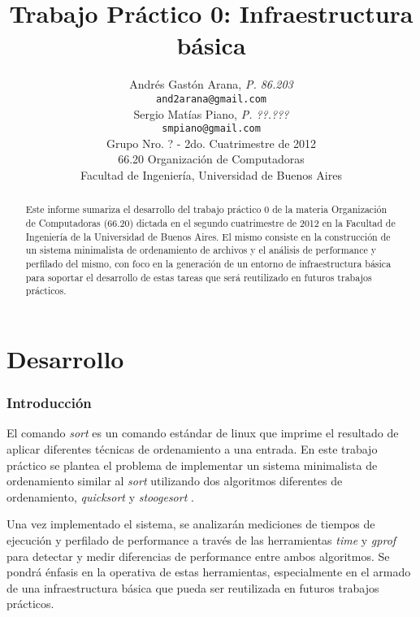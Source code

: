 \documentclass[a4paper,11pt]{article}
\title{\textbf{Trabajo Práctico 0: Infraestructura básica}}
\author{
  Andrés Gastón Arana, \textit{P. 86.203}                          \\
  \texttt{and2arana@gmail.com}                                     \\
  Sergio Matías Piano, \textit{P. ??.???}                          \\
  \texttt{smpiano@gmail.com}                                       \\ [2.5ex]
  \normalsize{Grupo Nro. ? - 2do. Cuatrimestre de 2012}            \\
  \normalsize{66.20 Organización de Computadoras}                  \\
  \normalsize{Facultad de Ingeniería, Universidad de Buenos Aires}
}
\date{}
\begin{document}
\thispagestyle{empty}
\maketitle

\begin{abstract}

  Este informe sumariza el desarrollo del trabajo práctico 0 de la materia
  Organización de Computadoras (66.20) dictada en el segundo cuatrimestre de
  2012 en la Facultad de Ingeniería de la Universidad de Buenos Aires. El mismo
  consiste en la construcción de un sistema minimalista de ordenamiento de
  archivos y el análisis de performance y perfilado del mismo, con foco en la
  generación de un entorno de infraestructura básica para soportar el
  desarrollo de estas tareas que será reutilizado en futuros trabajos
  prácticos.

\end{abstract}

\clearpage

\tableofcontents
\clearpage


\part{Desarrollo}

\section{Introducción}

El comando \textit{sort} \cite{WIKISORT} es un comando estándar de linux que
imprime el resultado de aplicar diferentes técnicas de ordenamiento a una
entrada. En este trabajo práctico se plantea el problema de implementar un
sistema minimalista de ordenamiento similar al \textit{sort} utilizando dos
algoritmos diferentes de ordenamiento, \textit{quicksort} \cite{WIKIQS} y
\textit{stoogesort} \cite{WIKIST}.

Una vez implementado el sistema, se analizarán mediciones de tiempos de
ejecución y perfilado de performance a través de las herramientas \textit{time}
\cite{WIKITIME} y \textit{gprof} \cite{GPROF} para detectar y medir diferencias
de performance entre ambos algoritmos. Se pondrá énfasis en la operativa de
estas herramientas, especialmente en el armado de una infraestructura básica
que pueda ser reutilizada en futuros trabajos prácticos.
\end{document}
